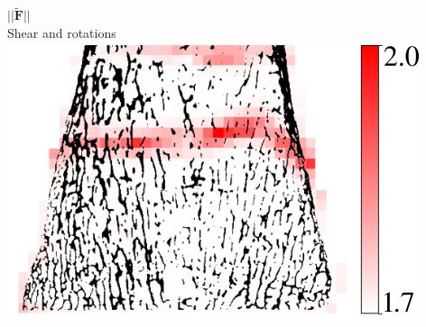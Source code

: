 \documentclass[xcolor=table,11pt]{beamer}
\begin{document}
\begin{frame}
\begin{columns}
			\centering
			$||\tilde{\mathbf{F}}||$\\
			\vfill
			Shear and rotations\\
			\includegraphics[width=\linewidth]{Figures/SL3}\\

		\end{columns}
	\end{frame}
	
	
\end{document}
